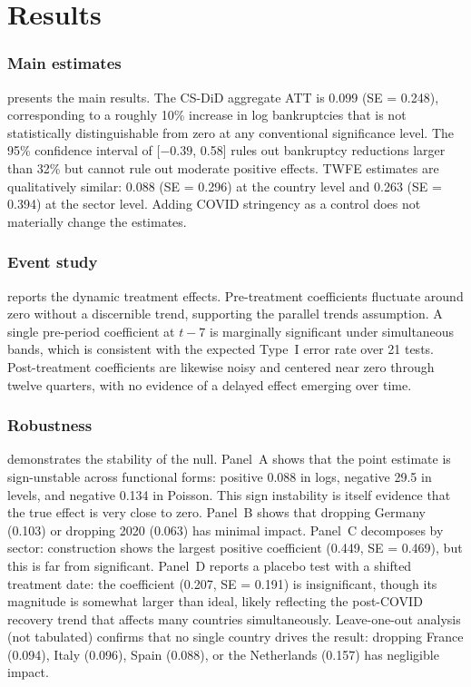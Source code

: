 \documentclass[12pt]{article}
\begin{document}
\section{Results}
\label{sec:results}

\subsubsection*{Main estimates}  presents the main results. The CS-DiD aggregate ATT is 0.099 (SE = 0.248), corresponding to a roughly 10\% increase in log bankruptcies that is not statistically distinguishable from zero at any conventional significance level. The 95\% confidence interval of [$-0.39$, 0.58] rules out bankruptcy reductions larger than 32\% but cannot rule out moderate positive effects. TWFE estimates are qualitatively similar: 0.088 (SE = 0.296) at the country level and 0.263 (SE = 0.394) at the sector level. Adding COVID stringency as a control does not materially change the estimates.



\subsubsection*{Event study}  reports the dynamic treatment effects. Pre-treatment coefficients fluctuate around zero without a discernible trend, supporting the parallel trends assumption. A single pre-period coefficient at $t-7$ is marginally significant under simultaneous bands, which is consistent with the expected Type~I error rate over 21 tests. Post-treatment coefficients are likewise noisy and centered near zero through twelve quarters, with no evidence of a delayed effect emerging over time.



\subsubsection*{Robustness}  demonstrates the stability of the null. Panel~A shows that the point estimate is sign-unstable across functional forms: positive 0.088 in logs, negative 29.5 in levels, and negative 0.134 in Poisson. This sign instability is itself evidence that the true effect is very close to zero. Panel~B shows that dropping Germany (0.103) or dropping 2020 (0.063) has minimal impact. Panel~C decomposes by sector: construction shows the largest positive coefficient (0.449, SE = 0.469), but this is far from significant. Panel~D reports a placebo test with a shifted treatment date: the coefficient (0.207, SE = 0.191) is insignificant, though its magnitude is somewhat larger than ideal, likely reflecting the post-COVID recovery trend that affects many countries simultaneously. Leave-one-out analysis (not tabulated) confirms that no single country drives the result: dropping France (0.094), Italy (0.096), Spain (0.088), or the Netherlands (0.157) has negligible impact.
\end{document}
